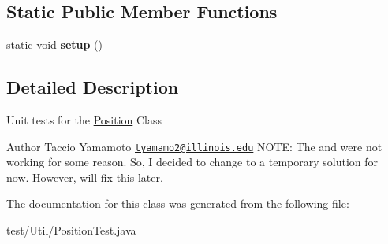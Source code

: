 \subsection*{Static Public Member Functions}
\begin{DoxyCompactItemize}
\item 
\hypertarget{classUtil_1_1PositionTest_a5ed0b8b302afeb94aa41573cf7b48ed1}{static void {\bfseries setup} ()}\label{classUtil_1_1PositionTest_a5ed0b8b302afeb94aa41573cf7b48ed1}

\end{DoxyCompactItemize}


\subsection{Detailed Description}
Unit tests for the \hyperlink{classUtil_1_1Position}{Position} Class \begin{DoxyAuthor}{Author}
Taccio Yamamoto \href{mailto:tyamamo2@illinois.edu}{\tt tyamamo2@illinois.\-edu} N\-O\-T\-E\-: The  and  were not working for some reason. So, I decided to change to a temporary solution for now. However, will fix this later. 
\end{DoxyAuthor}


The documentation for this class was generated from the following file\-:\begin{DoxyCompactItemize}
\item 
test/\-Util/Position\-Test.\-java\end{DoxyCompactItemize}
